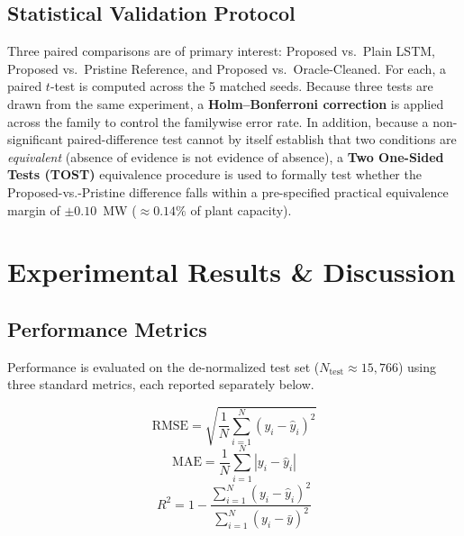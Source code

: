 \documentclass[conference]{IEEEtran}
\begin{document}
\subsection{Statistical Validation Protocol}
\label{sec:stat_protocol}
Three paired comparisons are of primary interest: Proposed vs.\ Plain LSTM, Proposed vs.\ Pristine Reference, and Proposed vs.\ Oracle-Cleaned. For each, a paired $t$-test is computed across the 5 matched seeds. Because three tests are drawn from the same experiment, a \textbf{Holm--Bonferroni correction} is applied across the family to control the familywise error rate. In addition, because a non-significant paired-difference test cannot by itself establish that two conditions are \emph{equivalent} (absence of evidence is not evidence of absence), a \textbf{Two One-Sided Tests (TOST)} equivalence procedure is used to formally test whether the Proposed-vs.-Pristine difference falls within a pre-specified practical equivalence margin of $\pm 0.10$~MW ($\approx 0.14\%$ of plant capacity).

\section{Experimental Results \& Discussion}

\subsection{Performance Metrics}
Performance is evaluated on the de-normalized test set ($N_{\text{test}} \approx 15{,}766$) using three standard metrics, each reported separately below.

\begin{equation}
\text{RMSE} = \sqrt{\frac{1}{N}\sum_{i=1}^N (y_i - \hat{y}_i)^2}
\label{eq:rmse}
\end{equation}
\begin{equation}
\text{MAE} = \frac{1}{N}\sum_{i=1}^N |y_i - \hat{y}_i|
\label{eq:mae}
\end{equation}
\begin{equation}
R^2 = 1 - \frac{\sum_{i=1}^N (y_i - \hat{y}_i)^2}{\sum_{i=1}^N (y_i - \bar{y})^2}
\label{eq:r2}
\end{equation}
\end{document}
